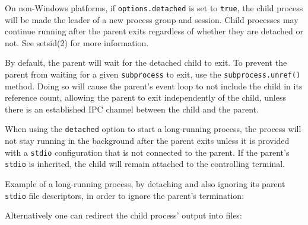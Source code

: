 On non-Windows platforms, if \texttt{options.detached} is set to
\texttt{true}, the child process will be made the leader of a new
process group and session. Child processes may continue running after
the parent exits regardless of whether they are detached or not. See
setsid(2) for more information.

By default, the parent will wait for the detached child to exit. To
prevent the parent from waiting for a given \texttt{subprocess} to exit,
use the \texttt{subprocess.unref()} method. Doing so will cause the
parent's event loop to not include the child in its reference count,
allowing the parent to exit independently of the child, unless there is
an established IPC channel between the child and the parent.

When using the \texttt{detached} option to start a long-running process,
the process will not stay running in the background after the parent
exits unless it is provided with a \texttt{stdio} configuration that is
not connected to the parent. If the parent's \texttt{stdio} is
inherited, the child will remain attached to the controlling terminal.

Example of a long-running process, by detaching and also ignoring its
parent \texttt{stdio} file descriptors, in order to ignore the parent's
termination:

\begin{Shaded}
\begin{Highlighting}[]
\OperatorTok{=} \NormalTok{(}\NormalTok{)}\OperatorTok{;}

\OperatorTok{=} \NormalTok{(}\NormalTok{[}\NormalTok{]}\OperatorTok{,}\NormalTok{ [}\NormalTok{]}\OperatorTok{,}\NormalTok{ \{}
  \OperatorTok{:} \OperatorTok{,}
  \OperatorTok{:} \OperatorTok{,}
\NormalTok{\})}\OperatorTok{;}

\NormalTok{()}\OperatorTok{;}
\end{Highlighting}
\end{Shaded}

Alternatively one can redirect the child process' output into files:

